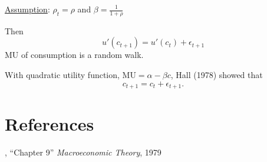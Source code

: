 \documentclass[twoside]{article}
\begin{document}
\underline{Assumption}: $\rho_{t} = \rho$ and $\beta = \frac{1}{1+ \rho}$

Then 
\begin{equation}
    u'(c_{t+1}) = u'(c_{t}) + \epsilon_{t+1}
\end{equation}
MU of consumption is a random walk.

With quadratic utility function, $\text{MU} = \alpha - \beta c$, Hall (1978) showed that
\begin{equation}
    c_{t+1} = c_{t} + \epsilon_{t+1}.
\end{equation}



\clearpage
\section*{References}
\beginrefs
, 
``Chapter 9''
{\it Macroeconomic Theory},
1979
\endrefs

\end{document}
